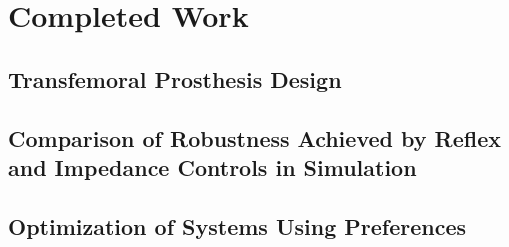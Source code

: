 \chapter{Completed Work}

\section{Transfemoral Prosthesis Design}
\section{Comparison of Robustness Achieved by Reflex and Impedance Controls in Simulation}
\section{Optimization of Systems Using Preferences}
